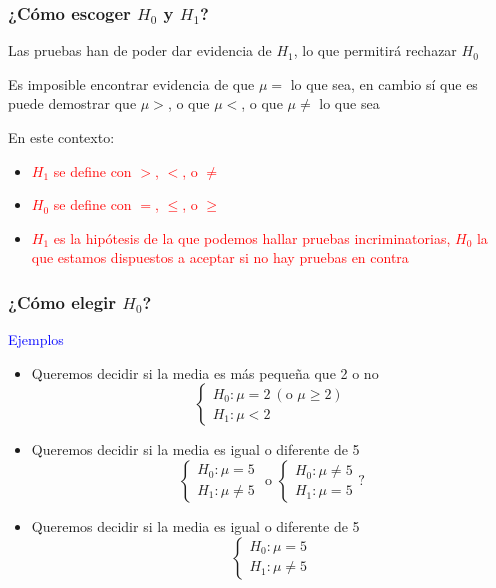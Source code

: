 \documentclass[12pt,t]{beamer}\usepackage[]{graphicx}\usepackage[]{color}
\newcommand{\red}[1]{\textcolor{red}{#1}}
\newcommand{\blue}[1]{\textcolor{blue}{#1}}
\renewcommand{\leq}{\leqslant}
\renewcommand{\geq}{\geqslant}
\theoremstyle{plain}
\theoremstyle{definition}
\begin{document}
\begin{frame}
\frametitle{¿Cómo escoger $H_0$ y $H_1$?}

Las pruebas han de poder dar evidencia de $H_1$, lo que permitirá rechazar $H_0$
\bigskip


Es imposible encontrar evidencia de que $\mu=$ lo que sea, en cambio sí que es puede demostrar que $\mu>$, o que $\mu<$, o que $\mu\neq$ lo que sea
\medskip

En este contexto:

\begin{itemize}

\item\red{$H_1$ se define  con  $>$, $<$, o $\neq$}

\item \red{$H_0$ se define con  $=$, $\leq $, o $\geq $}

\item \red{$H_1$ es la hipótesis de la que podemos hallar pruebas incriminatorias, $H_0$ la que estamos dispuestos a aceptar si no hay pruebas en contra}
\end{itemize}
\end{frame}

\begin{frame}
\frametitle{¿Cómo elegir $H_0$?}

\blue{Ejemplos}

\begin{itemize}
\item Queremos decidir si la media es más pequeña que 2 o no
$$
\left\{\begin{array}{ll} 
H_{0}:\mu= 2\ (\mbox{o } \mu \geq 2)\\ 
H_{1}:\mu< 2
\end{array}
\right.
$$
\item Queremos decidir si la media es igual o diferente de 5
$$
\left\{\begin{array}{ll} 
H_{0}:\mu= 5\\
H_{1}:\mu\neq 5
\end{array}
\right.
\mbox{ o }
\left\{\begin{array}{ll} 
H_{0}:\mu\neq 5\\
H_{1}:\mu= 5
\end{array}
\right.
\mbox{?}
$$
\item Queremos decidir si la media es igual o diferente de 5
$$
\left\{\begin{array}{ll} 
H_{0}:\mu= 5\\
H_{1}:\mu\neq 5
\end{array}
\right.
$$
\end{itemize}
\end{frame}
\end{document}
